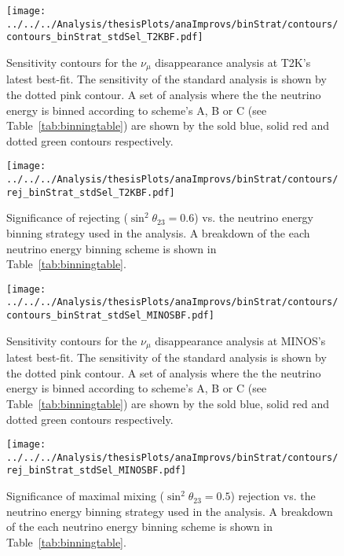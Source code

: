 \begin{figure}
  \centering
  \texttt{[image: ../../../Analysis/thesisPlots/anaImprovs/binStrat/contours/contours\_binStrat\_stdSel\_T2KBF.pdf]}
  \caption{
    Sensitivity contours for the $\nu_\mu$ disappearance analysis at
    T2K's latest best-fit. The sensitivity of the standard
    analysis is shown by the dotted pink contour. A set of analysis
    where the the neutrino energy is binned according to scheme's A, B
    or C (see Table~\ref{tab:binningtable}) are shown by the sold blue,
    solid red and dotted green contours respectively.
  } 
  \label{fig:binStratContour_T2K}
\end{figure}
\begin{figure}
  \centering
  \texttt{[image: ../../../Analysis/thesisPlots/anaImprovs/binStrat/contours/rej\_binStrat\_stdSel\_T2KBF.pdf]}
  \caption{
    Significance of rejecting ($\sin^2\theta_{23} = 0.6$) vs. the
    neutrino energy binning strategy used in the 
    analysis. A breakdown of the each neutrino energy binning scheme
    is shown in Table~\ref{tab:binningtable}.
  } 
  \label{fig:hadEFracRej_T2K}
\end{figure}

\begin{figure}
  \centering
  \texttt{[image: ../../../Analysis/thesisPlots/anaImprovs/binStrat/contours/contours\_binStrat\_stdSel\_MINOSBF.pdf]}
  \caption{
    Sensitivity contours for the $\nu_\mu$ disappearance analysis at
    MINOS's latest best-fit. The sensitivity of the standard
    analysis is shown by the dotted pink contour. A set of analysis
    where the the neutrino energy is binned according to scheme's A, B
    or C (see Table~\ref{tab:binningtable}) are shown by the sold
    blue, solid red and dotted green contours respectively.
  } 
  \label{fig:binStratContour_MINOS}
\end{figure}
\begin{figure}
  \centering
  \texttt{[image: ../../../Analysis/thesisPlots/anaImprovs/binStrat/contours/rej\_binStrat\_stdSel\_MINOSBF.pdf]}
  \caption{
    Significance of maximal mixing ($\sin^2\theta_{23} = 0.5$)
    rejection vs. the neutrino energy binning strategy used in the
    analysis. A breakdown of the each neutrino energy binning scheme
    is shown in Table~\ref{tab:binningtable}.
  } 
  \label{fig:hadEFracRej_MINOS}
\end{figure}



